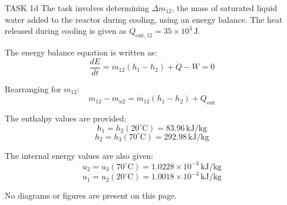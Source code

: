 TASK 1d  
The task involves determining \( \Delta m_{12} \), the mass of saturated liquid water added to the reactor during cooling, using an energy balance. The heat released during cooling is given as \( Q_{\text{out},12} = 35 \times 10^3 \, \text{J} \).

The energy balance equation is written as:  
\[
\frac{dE}{dt} = \dot{m}_{12} (h_1 - h_2) + \dot{Q} - \dot{W} = 0
\]

Rearranging for \( m_{12} \):  
\[
m_{12} - m_{u2} = \dot{m}_{12} (h_1 - h_2) + Q_{\text{out}}
\]

The enthalpy values are provided:  
\[
h_1 = h_2(20^\circ\text{C}) = 83.96 \, \text{kJ/kg}
\]
\[
h_2 = h_3(70^\circ\text{C}) = 292.98 \, \text{kJ/kg}
\]

The internal energy values are also given:  
\[
u_2 = u_3(70^\circ\text{C}) = 1.0228 \times 10^{-3} \, \text{kJ/kg}
\]
\[
u_1 = u_2(20^\circ\text{C}) = 1.0018 \times 10^{-3} \, \text{kJ/kg}
\]  

No diagrams or figures are present on this page.